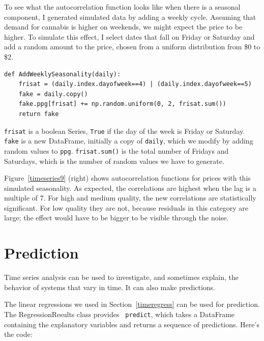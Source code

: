 \documentclass[12pt]{book}
\begin{document}
To see what the autocorrelation function looks like when there is a
seasonal component, I generated simulated data by adding a weekly
cycle.  Assuming that demand for cannabis is higher on weekends, we
might expect the price to be higher.  To simulate this effect, I
select dates that fall on Friday or Saturday and add a random amount
to the price, chosen from a uniform distribution from \$0 to \$2.

\begin{verbatim}
def AddWeeklySeasonality(daily):
    frisat = (daily.index.dayofweek==4) | (daily.index.dayofweek==5)
    fake = daily.copy()
    fake.ppg[frisat] += np.random.uniform(0, 2, frisat.sum())
    return fake
\end{verbatim}

{\tt frisat} is a boolean Series, {\tt True} if the day of the
week is Friday or Saturday.  {\tt fake} is a new DataFrame, initially
a copy of {\tt daily}, which we modify by adding random values
to {\tt ppg}.  {\tt frisat.sum()} is the total number of Fridays
and Saturdays, which is the number of random values we have to
generate.

Figure~\ref{timeseries9} (right) shows autocorrelation functions for
prices with this simulated seasonality.  As expected, the
correlations are highest when the lag is a multiple of 7.  For
high and medium quality, the new correlations are statistically
significant.  For low quality they are not, because residuals in this
category are large; the effect would have to be bigger
to be visible through the noise.
   


\section{Prediction}  

Time series analysis can be used to investigate, and sometimes
explain, the behavior of systems that vary in time.  It can also
make predictions.

The linear regressions we used in Section~\ref{timeregress} can be
used for prediction.  The RegressionResults class provides {\tt
  predict}, which takes a DataFrame containing the explanatory
variables and returns a sequence of predictions.  Here's the code:
\end{document}
